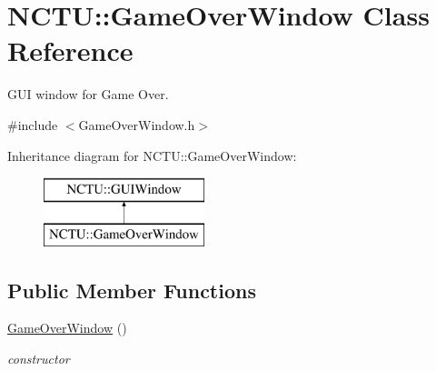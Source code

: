 \hypertarget{class_n_c_t_u_1_1_game_over_window}{}\section{N\+C\+TU\+:\+:Game\+Over\+Window Class Reference}
\label{class_n_c_t_u_1_1_game_over_window}


G\+UI window for Game Over.  




{\ttfamily \#include $<$Game\+Over\+Window.\+h$>$}

Inheritance diagram for N\+C\+TU\+:\+:Game\+Over\+Window\+:\begin{figure}[H]
\begin{center}
\leavevmode
\includegraphics[height=2.000000cm]{class_n_c_t_u_1_1_game_over_window}
\end{center}
\end{figure}
\subsection*{Public Member Functions}
\begin{DoxyCompactItemize}
\item 
\hyperlink{class_n_c_t_u_1_1_game_over_window_a9d321911e4e3ffe1fad77e2ceba5645e}{Game\+Over\+Window} ()\hypertarget{class_n_c_t_u_1_1_game_over_window_a9d321911e4e3ffe1fad77e2ceba5645e}{}\label{class_n_c_t_u_1_1_game_over_window_a9d321911e4e3ffe1fad77e2ceba5645e}

\begin{DoxyCompactList}\small\item\em constructor \end{DoxyCompactList}\end{DoxyCompactItemize}
